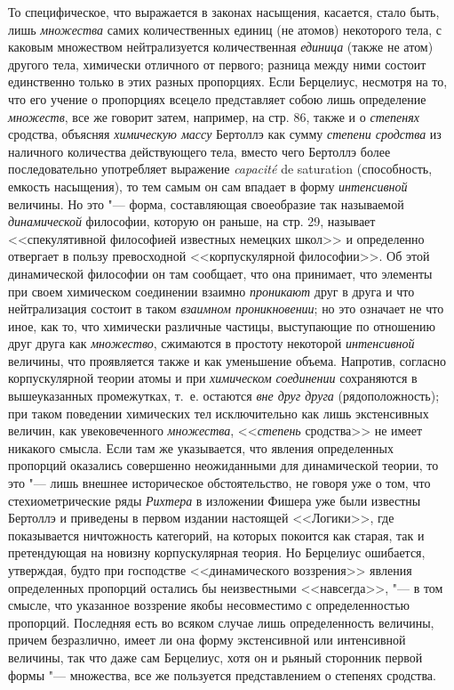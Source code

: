 То специфическое, что выражается в законах насыщения, касается, стало быть,
лишь {\em множества} самих количественных единиц (не
атомов) некоторого тела, с каковым множеством нейтрализуется количественная
{\em единица} (также не атом) другого тела, химически
отличного от первого; разница между ними состоит единственно только в этих
разных пропорциях. Если Берцелиус, несмотря на то, что его учение о
пропорциях всецело представляет собою лишь определение
{\em множеств}, все же говорит затем, например, на стр.
86, также и о {\em степенях} сродства, объясняя
{\em химическую массу} Бертоллэ как сумму
{\em степени сродства} из наличного количества
действующего тела, вместо чего Бертоллэ более последовательно употребляет
выражение {\em capacité }de saturation (способность,
емкость насыщения), то тем самым он сам впадает в форму
{\em интенсивной} величины. Но это "--- форма,
составляющая своеобразие так называемой
{\em динамической} философии, которую он раньше, на
стр. 29, называет <<спекулятивной философией известных немецких школ>> и
определенно отвергает в пользу превосходной <<корпускулярной философии>>. Об
этой динамической философии он там сообщает, что она принимает, что
элементы при своем химическом соединении взаимно
{\em проникают} друг в друга и что нейтрализация
состоит в таком {\em взаимном проникновении}; но это
означает не что иное, как то, что химически различные частицы, выступающие
по отношению друг друга как {\em множество}, сжимаются
в простоту некоторой {\em интенсивной} величины, что
проявляется также и как уменьшение объема. Напротив, согласно
корпускулярной теории атомы и при {\em химическом
соединении} сохраняются в вышеуказанных промежутках, т.~е. остаются
{\em вне друг друга} (рядоположность); при таком
поведении химических тел исключительно как лишь экстенсивных величин, как
увековеченного {\em множества},
<<{\em степень} сродства>> не имеет никакого смысла. Если
там же указывается, что явления определенных пропорций оказались совершенно
неожиданными для динамической теории, то это "--- лишь внешнее историческое
обстоятельство, не говоря уже о том, что стехиометрические ряды
{\em Рихтера} в изложении Фишера уже были известны
Бертоллэ и приведены в первом издании настоящей <<Логики>>, где показывается
ничтожность категорий, на которых покоится как старая, так и претендующая на
новизну корпускулярная теория. Но Берцелиус ошибается, утверждая, будто при
господстве <<динамического воззрения>> явления определенных пропорций
остались бы неизвестными <<навсегда>>, "--- в том смысле, что указанное
воззрение якобы несовместимо с определенностью пропорций. Последняя есть во
всяком случае лишь определенность величины, причем безразлично, имеет ли
она форму экстенсивной или интенсивной величины, так что даже сам
Берцелиус, хотя он и рьяный сторонник первой формы "--- множества, все же
пользуется представлением о степенях сродства.

